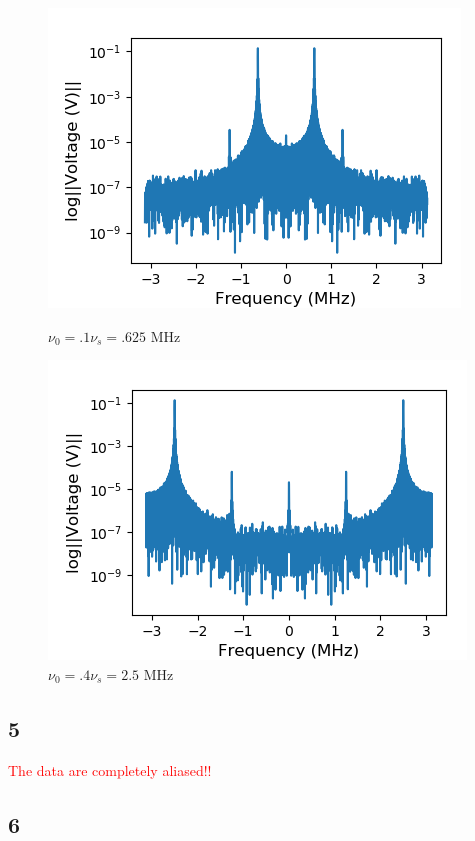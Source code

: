 \documentclass[a4paper]{article}
\begin{document}
\begin{figure}
\centering
\begin{minipage}{.5\textwidth}
	\centering
	\includegraphics[width=.8\linewidth]{5-4/t1_quarter}
	\caption{$\nu_0 = .1 \nu_s = .625$ MHz}
	\label{fig:tenth_leakage}
\end{minipage}%
\begin{minipage}{.5\textwidth}
	\centering
	\includegraphics[width=.8\linewidth]{5-4/t4_quarter}
	\caption{$\nu_0 = .4 \nu_s = 2.5$ MHz}
	\label{fig:4tenths_leakage}
\end{minipage}
\end{figure}

\subsection{5}

\textcolor{red}{The data are completely aliased!!}

\subsection{6}
\end{document}
